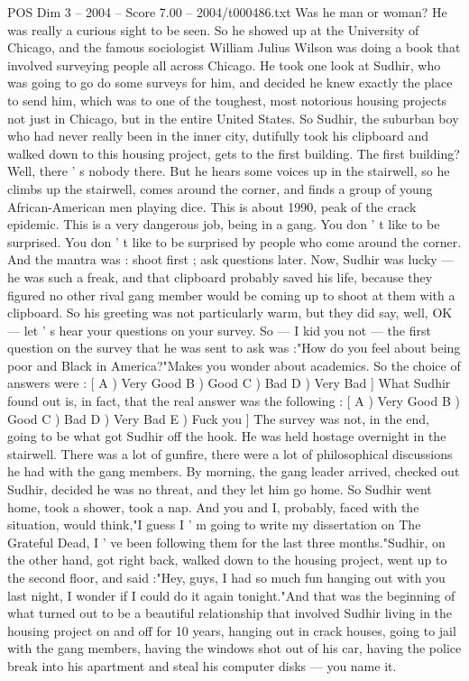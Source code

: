 \begin{textsample}{POS Dim 3 – 2004 – Score 7.00 – 2004/t000486.txt}
Was he man or woman?
He was really a curious sight to be seen.
So he showed up at the University of Chicago, and the famous sociologist William Julius Wilson was doing a book that involved surveying people all across Chicago.
He took one look at Sudhir, who was going to go do some surveys for him, and decided he knew exactly the place to send him, which was to one of the toughest, most notorious housing projects not just in Chicago, but in the entire United States.
So Sudhir, the suburban boy who had never really been in the inner city, dutifully took his clipboard and walked down to this housing project, gets to the first building.
The first building?
Well, there ' s nobody there.
But he hears some voices up in the stairwell, so he climbs up the stairwell, comes around the corner, and finds a group of young African-American men playing dice.
This is about 1990, peak of the crack epidemic.
This is a very dangerous job, being in a gang.
You don ' t like to be surprised.
You don ' t like to be surprised by people who come around the corner.
And the mantra was : shoot first ; ask questions later.
Now, Sudhir was lucky — he was such a freak, and that clipboard probably saved his life, because they figured no other rival gang member would be coming up to shoot at them with a clipboard.
So his greeting was not particularly warm, but they did say, well, OK — let ' s hear your questions on your survey.
So — I kid you not — the first question on the survey that he was sent to ask was :"How do you feel about being poor and Black in America?"Makes you wonder about academics.
So the choice of answers were : [ A ) Very Good B ) Good C ) Bad D ) Very Bad ] What Sudhir found out is, in fact, that the real answer was the following : [ A ) Very Good B ) Good C ) Bad D ) Very Bad E ) Fuck you ] The survey was not, in the end, going to be what got Sudhir off the hook.
He was held hostage overnight in the stairwell.
There was a lot of gunfire, there were a lot of philosophical discussions he had with the gang members.
By morning, the gang leader arrived, checked out Sudhir, decided he was no threat, and they let him go home.
So Sudhir went home, took a shower, took a nap.
And you and I, probably, faced with the situation, would think,"I guess I ' m going to write my dissertation on The Grateful Dead, I ' ve been following them for the last three months."Sudhir, on the other hand, got right back, walked down to the housing project, went up to the second floor, and said :"Hey, guys, I had so much fun hanging out with you last night, I wonder if I could do it again tonight."And that was the beginning of what turned out to be a beautiful relationship that involved Sudhir living in the housing project on and off for 10 years, hanging out in crack houses, going to jail with the gang members, having the windows shot out of his car, having the police break into his apartment and steal his computer disks — you name it.

\end{textsample}
